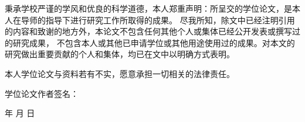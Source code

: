  {\fontsize{10.5pt}{13pt}\selectfont \twospace 秉承学校严谨的学风和优良的科学道德，本人郑重声明：所呈交的学位论文，是本人在导师的指导下进行研究工作所取得的成果。
 尽我所知，除文中已经注明引用的内容和致谢的地方外，本论文不包含任何其他个人或集体已经公开发表或撰写过的研究成果，
 不包含本人或其他已申请学位或其他用途使用过的成果。对本文的研究做出重要贡献的个人和集体，均已在文中以明确方式表明。

\twospace 本人学位论文与资料若有不实，愿意承担一切相关的法律责任。

\vspace{0.5\baselineskip}

\hspace{14em} 学位论文作者签名：\underline{\quad\quad\quad\quad\quad\quad\quad}

\hspace{18em} \quad 年 \quad 月 \quad 日}











